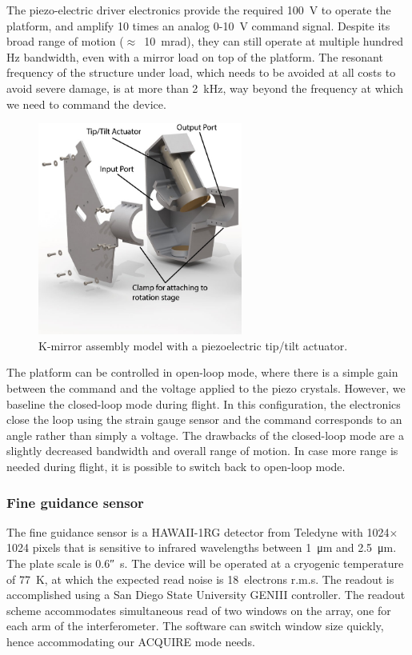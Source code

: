 The piezo-electric driver electronics provide the required \SI{100}{\volt} to operate the platform, and amplify 10 times an analog 0-10~\si{\volt} command signal. Despite its broad range of motion ($\approx$~\SI{10}{\milli\radian}), they can still operate at multiple hundred \si{\hertz} bandwidth, even with a mirror load on top of the platform. The resonant frequency of the structure under load, which needs to be avoided at all costs to avoid severe damage, is at more than \SI{2}{\kilo\hertz}, way beyond the frequency at which we need to command the device.

\begin{figure}[!h]
		\centering
		\includegraphics[width=0.6\textwidth]{Figures/Kmirror.jpg} 
		\caption[Kmirror]{K-mirror assembly model with a piezoelectric tip/tilt actuator.}
		\label{fig:Kmirror}
\end{figure}


The platform can be controlled in open-loop mode, where there is a simple gain between the command and the voltage applied to the piezo crystals. However, we baseline the closed-loop mode during flight. In this configuration, the electronics close the loop using the strain gauge sensor and the command corresponds to an angle rather than simply a voltage. The drawbacks of the closed-loop mode are a slightly decreased bandwidth and overall range of motion. In case more range is needed during flight, it is possible to switch back to open-loop mode. 


 
 
\subsubsection{Fine guidance sensor}
\label{subsec:FGS}
The fine guidance sensor is a HAWAII-1RG detector from Teledyne with 1024$\times$1024 pixels that is sensitive to infrared wavelengths between \SI{1}{\um} and \SI{2.5}{\um}. The plate scale is \ang{;;0.6}\si{\per\second}. The device will be operated at a cryogenic temperature of \SI{77}{\kelvin}, at which the expected read noise is 18~electrons r.m.s. The readout is accomplished using a San Diego State University GENIII \citep{Leach:1994fp} controller. The readout scheme accommodates simultaneous read of two windows on the array, one for each arm of the interferometer. The software can switch window size quickly, hence accommodating our ACQUIRE mode needs. 

